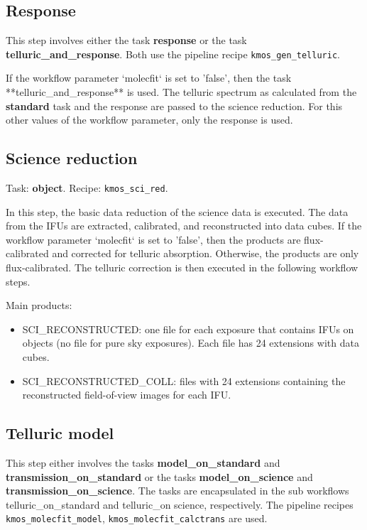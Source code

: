 \subsection{Response}

This step involves either the task {\bf response} or the task {\bf telluric\_and\_response}. Both use the pipeline recipe
{\tt kmos\_gen\_telluric}.

If the workflow parameter `molecfit` is set to 'false', then the task **telluric\_and\_response** is used. 
The telluric spectrum as calculated from the {\bf standard} task and the response are passed to the science reduction.
For this other values of the workflow parameter, only the response is used.

\subsection{Science reduction}

Task: {\bf object}. Recipe: {\tt kmos\_sci\_red}.

In this step, the basic data reduction of the science data is executed. The data from the IFUs are extracted, 
calibrated, and reconstructed into data cubes. If the workflow parameter `molecfit` is set to 'false', then the 
products are flux-calibrated and corrected for telluric absorption. Otherwise, the products are only
flux-calibrated. The telluric correction is then executed in the following workflow steps.

Main products:
\begin{itemize}

\item SCI\_RECONSTRUCTED: one file for each exposure that contains
  IFUs on objects (no file for pure sky exposures). Each file has 24
  extensions with data cubes.
  
\item SCI\_RECONSTRUCTED\_COLL: files with 24 extensions containing
  the reconstructed field-of-view images for each IFU.

\end{itemize}

\subsection{Telluric model}

This step either involves the tasks {\bf model\_on\_standard} and {\bf transmission\_on\_standard}
or the tasks {\bf model\_on\_science} and {\bf transmission\_on\_science}. The tasks are encapsulated in the
sub workflows telluric\_on\_standard and telluric\_on science, respectively.
The pipeline recipes {\tt kmos\_molecfit\_model},  {\tt kmos\_molecfit\_calctrans} are used.

